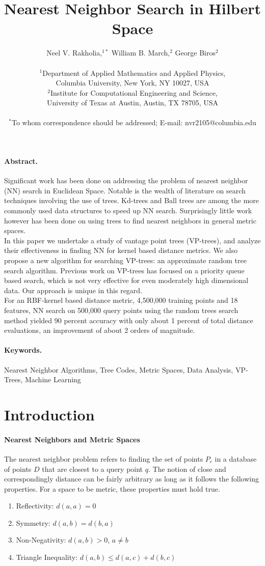 \documentclass[11pt]{article}
\title{Nearest Neighbor Search in Hilbert Space}
\author
{Neel V. Rakholia,$^{1\ast}$ William B. March,$^{2}$ George Biros$^{2}$\\
\\
\normalsize{$^{1}$Department of Applied Mathematics and Applied Physics,}\\
\normalsize{Columbia University,}
\normalsize{New York, NY 10027, USA}\\
\normalsize{$^{2}$Institute for Computational Engineering and Science,}\\
\normalsize{University of Texas at Austin,}
\normalsize{Austin, TX 78705, USA}\\
\\
\normalsize{$^\ast$To whom correspondence should be addressed; E-mail:  nvr2105@columbia.edu}
}
\date{}
\begin{document}
\maketitle 

\paragraph{Abstract.} Significant work has been done on addressing the problem of nearest neighbor (NN) search in Euclidean Space. Notable is the wealth of literature on search techniques involving the use of trees. Kd-trees and Ball trees are among the more commonly used data structures to speed up NN search. Surprisingly little work however has been done on using trees to find nearest neighbors in general metric spaces.
\\
\indent In this paper we undertake a study of vantage point trees (VP-trees), and analyze their effectiveness in finding NN for kernel based distance metrics. We also propose a new algorithm for searching VP-trees: an approximate random tree search algorithm. Previous work on VP-trees has focused on a priority queue based search, which is not very effective for even moderately high dimensional data. Our approach is unique in this regard.
\\
\indent For an RBF-kernel based distance metric, 4,500,000 training points and 18 features, NN search on 500,000 query points using the random trees search method yielded 90 percent accuracy with only about 1 percent of total distance evaluations, an improvement of about 2 orders of magnitude. 

\paragraph{Keywords.} Nearest Neighbor Algorithms, Tree Codes, Metric Spaces, Data Analysis, VP-Trees, Machine Learning

\section{Introduction} 
\paragraph{Nearest Neighbors and Metric Spaces} The nearest neighbor problem refers to finding the set of points $P_c$ in a database of points $D$ that are closest to a query point $q$. The notion of close and correspondingly distance can be fairly arbitrary as long as it follows the following properties. For a space to be metric, these properties must hold true.~\cite{Nayar08}
\begin{enumerate}
\item Reflectivity: $d(a,a) = 0$
\item Symmetry: $d(a,b) = d(b,a)$
\item Non-Negativity: $d(a,b) > 0$, $a \neq b$
\item Triangle Inequality: $d(a, b) \leq d(a, c) + d(b, c)$
\end{enumerate}
\end{document}
